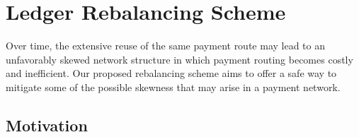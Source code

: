 \documentclass[sigconf]{acmart}
\begin{document}




\section{Ledger Rebalancing Scheme}\label{sec:protocol}

Over time, the extensive reuse of the same payment route may lead to an unfavorably skewed network structure in which payment routing becomes costly and inefficient. Our proposed rebalancing scheme aims to offer a safe way to mitigate some of the possible skewness that may arise in a payment network.

\subsection{Motivation}
\end{document}
